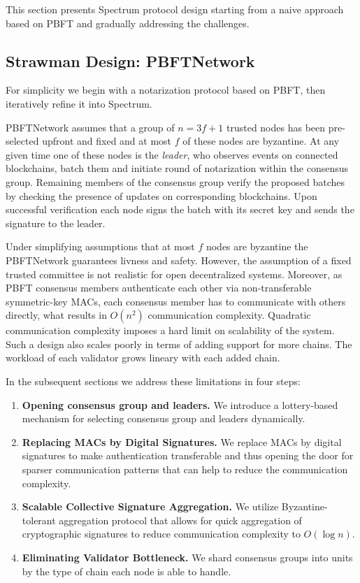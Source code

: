 This section presents Spectrum protocol design starting from a naive approach based on PBFT and gradually addressing the challenges.

\subsection{Strawman Design: PBFTNetwork}\label{subsec:strawman-design}

For simplicity we begin with a notarization protocol based on PBFT, then iteratively refine it into Spectrum.

PBFTNetwork assumes that a group of ${n = 3f + 1}$ trusted nodes has been pre-selected upfront and fixed and at most $f$ of these nodes are byzantine.
At any given time one of these nodes is the \emph{leader}, who observes events on connected blockchains,
batch them and initiate round of notarization within the consensus group.
Remaining members of the consensus group verify the proposed batches by checking the presence of updates on corresponding blockchains.
Upon successful verification each node signs the batch with its secret key and sends the signature to the leader.

Under simplifying assumptions that at most $f$ nodes are byzantine the PBFTNetwork guarantees livness and safety.
However, the assumption of a fixed trusted committee is not realistic for open decentralized systems.
Moreover, as PBFT consensus members authenticate each other via non-transferable symmetric-key MACs, each consensus
member has to communicate with others directly, what results in $O(n^2)$ communication complexity.
Quadratic communication complexity imposes a hard limit on scalability of the system.
Such a design also scales poorly in terms of adding support for more chains.
The workload of each validator grows lineary with each added chain.

In the subsequent sections we address these limitations in four steps:
\begin{enumerate}
    \item \textbf{Opening consensus group and leaders.} We introduce a lottery-based mechanism for selecting consensus group and leaders dynamically.
    \item \textbf{Replacing MACs by Digital Signatures.} We replace MACs by digital signatures to make authentication transferable
    and thus opening the door for sparser communication patterns that can help to reduce the communication complexity.
    \item \textbf{Scalable Collective Signature Aggregation.} We utilize Byzantine-tolerant aggregation protocol that allows for
    quick aggregation of cryptographic signatures to reduce communication complexity to $O(\log n)$.
    \item \textbf{Eliminating Validator Bottleneck.} We shard consensus groups into units by the type of chain each node is able to handle.
\end{enumerate}


